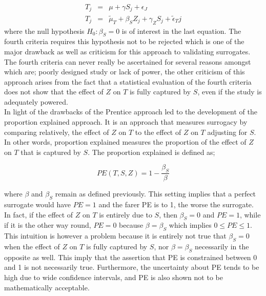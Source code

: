 \documentclass[a4paper,12pt]{article}
\begin{document}
	\begin{eqnarray}
	T_j &=& \mu + \gamma S_j + \epsilon_J\\
	T_j &=& \tilde{\mu}_T + \beta_SZ_j + \gamma_ZS_j + \tilde{\epsilon}_Tj
	\end{eqnarray}
	where the null hypothesis $H_0: \beta_S = 0$ is of interest in the last equation. The fourth criteria requires this hypothesis not to be rejected which is one of the major drawback as well as criticism for this approach to validating surrogates. The fourth criteria can never really be ascertained for several reasons amongst which are; poorly designed study or lack of power\citep{surrogate2,buyseM}, the other criticism of this approach arises from the fact that a statistical evaluation of the fourth criteria does not show that the effect of $Z$ on $T$ is fully captured by $S$, even if the study is adequately powered\citep{surrogate2,buyseM}.\\
	
	In light of the drawbacks of the Prentice approach led to the development of the proportion explained approach\citep{freedman}. It is an approach that measures surrogacy by comparing relatively, the effect of $Z$ on $T$ to the effect of $Z$ on $T$ adjusting for $S$\citep{buyseM,surrogate2}. In other words, proportion explained measures the proportion of the effect of $Z$ on $T$ that is captured by $S$\citep{buyseM}. The proportion explained is defined as;
	
	\begin{equation}
	PE(T,S,Z) = 1 - \frac{\beta_S}{\beta}
	\end{equation}
	
	where $\beta$ and $\beta_S$ remain as defined previously. This setting implies that a perfect surrogate would have $PE = 1$ and the farer PE is to 1, the worse the surrogate. In fact, if the effect of $Z$ on $T$ is entirely due to $S$, then $\beta_S = 0$ and $PE = 1$, while if it is the other way round, $PE = 0$ because $\beta = \beta_S$\citep{wim2016} which implies $0 \leq PE \leq 1$. This intuition is however a problem because it is entirely not true that $\beta_S = 0$ when the effect of $Z$ on $T$ is fully captured by $S$, nor $\beta = \beta_S$\citep{wim2016} necessarily in the opposite as well. This imply that the assertion that PE is constrained between 0 and 1 is not necessarily true\citep{wim2016,volding1990}. Furthermore, the uncertainty about PE tends to be high due to wide confidence intervals\citep{Degruttola}, and PE is also shown not to be mathematically acceptable\citep{buyseM,molenberghs2002}.\\
	
\end{document}

